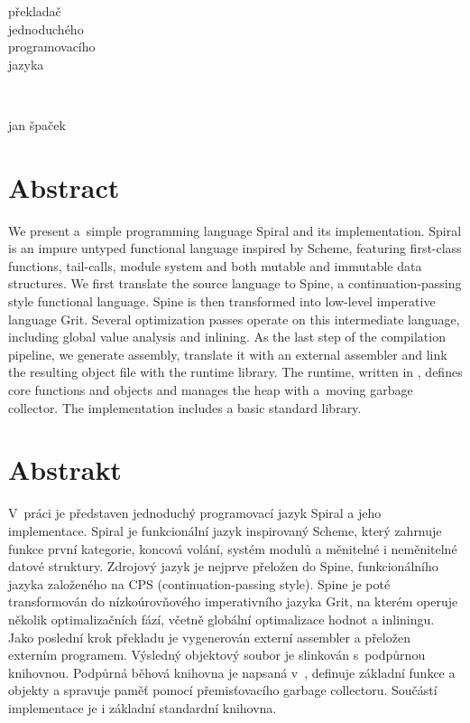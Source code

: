 \begin{titlingpage}
  \sffamily
  \begin{flushright}
    \fontsize{50}{60}\selectfont
    překladač\\
    jednoduchého\\
    programovacího\\
    jazyka
  \end{flushright}
  ~\\[15.5cm]
  \begin{flushleft}
    \fontsize{20}{24}\selectfont
    jan špaček
  \end{flushleft}
\end{titlingpage}

\thispagestyle{empty}
\cleardoublepage

\begin{adjustwidth}{1.5cm}{1.5cm}

\section*{Abstract}

We present a~simple programming language Spiral and its implementation. Spiral
is an impure untyped functional language inspired by Scheme, featuring
first-class functions, tail-calls, module system and both mutable and immutable
data structures. We first translate the source language to Spine, a
continuation-passing style functional language. Spine is then transformed into
low-level imperative language Grit. Several optimization passes operate on this
intermediate language, including global value analysis and inlining. As the last
step of the compilation pipeline, we generate assembly, translate it with an
external assembler and link the resulting object file with the runtime library.
The runtime, written in \Cplusplus, defines core functions and objects and
manages the heap with a~moving garbage collector. The implementation includes a
basic standard library.

\section*{Abstrakt}

V~práci je představen jednoduchý programovací jazyk Spiral a jeho implementace.
Spiral je funkcionální jazyk inspirovaný Scheme, který zahrnuje funkce první
kategorie, koncová volání, systém modulů a měnitelné i neměnitelné datové
struktury. Zdrojový jazyk je nejprve přeložen do Spine, funkcionálního jazyka
založeného na CPS (continuation-passing style). Spine je poté transformován do
nízkoúrovňového imperativního jazyka Grit, na kterém operuje několik
optimalizačních fází, včetně globální optimalizace hodnot a inliningu.  Jako
poslední krok překladu je vygenerován externí assembler a přeložen externím
programem.  Výsledný objektový soubor je slinkován s~podpůrnou knihovnou.
Podpůrná běhová knihovna je napsaná v~\Cplusplus, definuje základní funkce a
objekty a spravuje paměť pomocí přemisťovacího garbage collectoru. Součástí
implementace je i základní standardní knihovna.

\end{adjustwidth}

